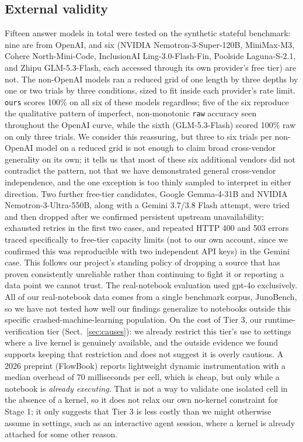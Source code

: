 \documentclass[11pt]{article}
\begin{document}
\subsection{External validity}
Fifteen answer models in total were tested on the synthetic stateful
benchmark: nine are from OpenAI, and six (NVIDIA Nemotron-3-Super-120B,
MiniMax-M3, Cohere North-Mini-Code, InclusionAI Ling-3.0-Flash-Fin,
Poolside Laguna-S-2.1, and Zhipu GLM-5.3-Flash, each accessed through its
own provider's free tier) are not. The non-OpenAI models ran a reduced
grid of one length by three depths by one or two trials by three
conditions, sized to fit inside each provider's rate limit.
\texttt{ours} scores 100\% on all six of these models regardless; five of
the six reproduce the qualitative pattern of imperfect, non-monotonic
\texttt{raw} accuracy seen throughout the OpenAI curve, while the sixth
(GLM-5.3-Flash) scored 100\% raw on only three trials. We consider this
reassuring, but three to six trials per non-OpenAI model on a reduced
grid is not enough to claim broad cross-vendor generality on its own; it
tells us that most of these six additional vendors did not contradict the
pattern, not that we have demonstrated general cross-vendor
independence, and the one exception is too thinly sampled to interpret
in either direction. Two further free-tier candidates, Google Gemma-4-31B
and NVIDIA Nemotron-3-Ultra-550B, along with a Gemini 3.7/3.8 Flash
attempt, were tried and then dropped after we confirmed persistent
upstream unavailability: exhausted retries in the first two cases, and
repeated HTTP 400 and 503 errors traced specifically to free-tier
capacity limits (not to our own account, since we confirmed this was
reproducible with two independent API keys) in the Gemini case. This
follows our project's standing policy of dropping a source that has
proven consistently unreliable rather than continuing to fight it or
reporting a data point we cannot trust. The real-notebook evaluation used
gpt-4o exclusively. All of our real-notebook data comes from a single
benchmark corpus, JunoBench, so we have not tested how well our findings
generalize to notebooks outside this specific crashed-machine-learning
population. On the cost of Tier 3, our runtime-verification tier
(Sect.~\ref{sec:causes}): we already restrict this tier's use to settings
where a live kernel is genuinely available, and the outside evidence we
found supports keeping that restriction and does not suggest it is
overly cautious. A 2026 preprint (FlowBook) reports lightweight dynamic
instrumentation with a median overhead of 70 milliseconds per cell,
which is cheap, but only while a notebook is \emph{already executing}.
That is not a way to validate one isolated cell in the absence of a
kernel, so it does not relax our own no-kernel constraint for Stage 1; it
only suggests that Tier 3 is less costly than we might otherwise assume
in settings, such as an interactive agent session, where a kernel is
already attached for some other reason.
\end{document}
